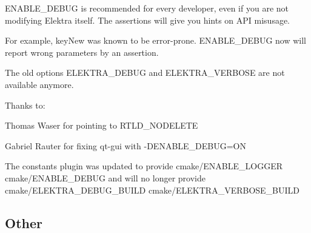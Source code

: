 E\+N\+A\+B\+L\+E\+\_\+\+D\+E\+B\+U\+G is recommended for every developer, even if you are not modifying Elektra itself. The assertions will give you hints on A\+P\+I misusage.

For example, {\ttfamily key\+New} was known to be error-\/prone. E\+N\+A\+B\+L\+E\+\_\+\+D\+E\+B\+U\+G now will report wrong parameters by an assertion.

The old options E\+L\+E\+K\+T\+R\+A\+\_\+\+D\+E\+B\+U\+G and E\+L\+E\+K\+T\+R\+A\+\_\+\+V\+E\+R\+B\+O\+S\+E are not available anymore.

Thanks to\+:
\begin{DoxyItemize}
\item Thomas Waser for pointing to R\+T\+L\+D\+\_\+\+N\+O\+D\+E\+L\+E\+T\+E
\item Gabriel Rauter for fixing qt-\/gui with -\/\+D\+E\+N\+A\+B\+L\+E\+\_\+\+D\+E\+B\+U\+G=O\+N
\end{DoxyItemize}

The constants plugin was updated to provide cmake/\+E\+N\+A\+B\+L\+E\+\_\+\+L\+O\+G\+G\+E\+R cmake/\+E\+N\+A\+B\+L\+E\+\_\+\+D\+E\+B\+U\+G and will no longer provide cmake/\+E\+L\+E\+K\+T\+R\+A\+\_\+\+D\+E\+B\+U\+G\+\_\+\+B\+U\+I\+L\+D cmake/\+E\+L\+E\+K\+T\+R\+A\+\_\+\+V\+E\+R\+B\+O\+S\+E\+\_\+\+B\+U\+I\+L\+D

\subsection*{Other}


